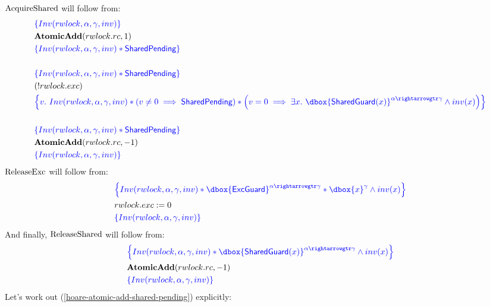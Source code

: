 \documentclass{article}
\newcommand\dboxed[1]{\dbox{\vphantom{t}\ensuremath{#1}}}
\newcommand{\pointsto}{\hookrightarrow}
\newcommand{\refines}{\rightarrowgtr}
\begin{document}
$\text{AcquireShared}$ will follow from:
\begin{align}
& \inlinehoare{ \Inv(\rwlock,\alpha,\gamma,\inv) } \nonumber \\
& \AtomicAdd(\rwlock.\rc, 1) \label{hoare-atomic-add-shared-pending} \\
& \inlinehoare{ \Inv(\rwlock,\alpha,\gamma,\inv) * \SharedPending } \nonumber\\
 \nonumber\\
& \inlinehoare{ \Inv(\rwlock,\alpha,\gamma,\inv) * \SharedPending }\nonumber\\
& (!\rwlock.\exc)\nonumber\\
& \inlinehoare{ v.~
    \Inv(\rwlock,\alpha,\gamma,\inv) * \left(v \ne 0 \implies \SharedPending\right)
        * \left(v = 0 \implies \exists x.~
          \dboxed{\SharedGuard(x)}^{\alpha \refines \gamma} \land \inv(x)\right)
   }\nonumber\\
   \nonumber\\
& \inlinehoare{ \Inv(\rwlock,\alpha,\gamma,\inv) * \SharedPending }\nonumber\\
& \AtomicAdd(\rwlock.\rc, -1)\nonumber\\
& \inlinehoare{ \Inv(\rwlock,\alpha,\gamma,\inv) }\nonumber
\end{align}
$\text{ReleaseExc}$ will follow from:
\begin{align*}
& \inlinehoare{ \Inv(\rwlock,\alpha,\gamma,\inv) * \dboxed{\ExcGuard}^{\alpha \refines \gamma} * \dboxed{x}^\gamma \land \inv(x) }\\
& \rwlock.\exc := 0\\
& \inlinehoare{ \Inv(\rwlock,\alpha,\gamma,\inv) }
\end{align*}
And finally, $\text{ReleaseShared}$ will follow from:
\begin{align*}
& \inlinehoare{ \Inv(\rwlock,\alpha,\gamma,\inv) * \dboxed{\SharedGuard(x)}^{\alpha \refines \gamma} \land \inv(x) }\\
& \AtomicAdd(\rwlock.\rc, -1)\\
& \inlinehoare{ \Inv(\rwlock,\alpha,\gamma,\inv) }
\end{align*}
Let's work out (\ref{hoare-atomic-add-shared-pending}) explicitly:
\end{document}
